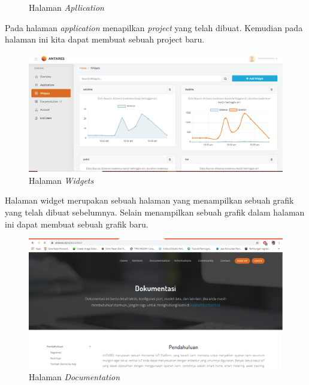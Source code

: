 \begin{enumerate}
\begin{figure}[H]
    \caption{Halaman \textit{Apllication}}
    \label{print}
    \end{figure}
    \par Pada halaman \textit{application} menapilkan \textit{project} yang telah dibuat. Kemudian pada halaman ini kita dapat membuat sebuah project baru.
      \begin{figure}[H]
    \centering
    \includegraphics[width=1\textwidth]{figures/antares8.png}
    \caption{Halaman \textit{Widgets}}
    \label{print}
    \end{figure}
    
    \par Halaman widget merupakan sebuah halaman yang menampilkan sebuah grafik yang telah dibuat sebelumnya. Selain menampilkan sebuah grafik dalam halaman ini dapat membuat sebuah grafik baru.
     \begin{figure}[H]
    \centering
    \includegraphics[width=1\textwidth]{figures/antares9.png}
    \caption{Halaman \textit{Documentation}}
    \label{print}
    \end{figure}
    

\end{enumerate}
